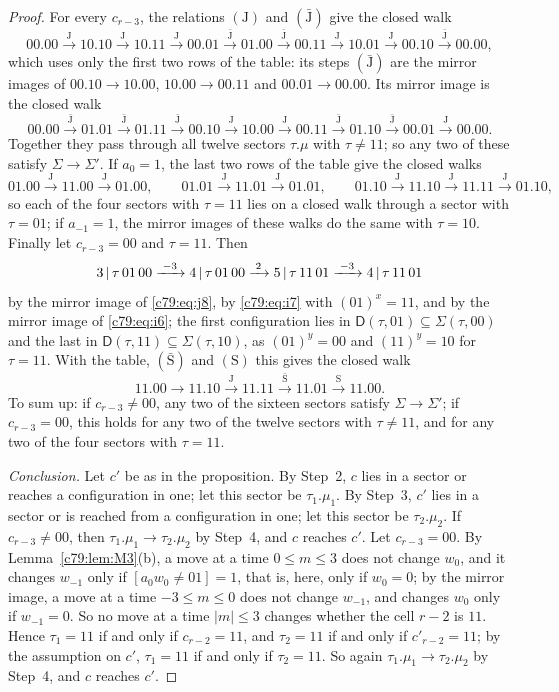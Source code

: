 \begin{proof}
For every $c_{r-3}$, the relations $(\mathrm J)$ and $(\bar{\mathrm J})$ give the closed walk
\[
00.00\xrightarrow{\mathrm J}10.10\xrightarrow{\mathrm J}10.11\xrightarrow{\mathrm J}00.01\xrightarrow{\bar{\mathrm J}}01.00\xrightarrow{\bar{\mathrm J}}00.11\xrightarrow{\mathrm J}10.01\xrightarrow{\mathrm J}00.10\xrightarrow{\bar{\mathrm J}}00.00,
\]
which uses only the first two rows of the table: its steps $(\bar{\mathrm J})$ are the mirror images of $00.10\to10.00$, $10.00\to00.11$ and $00.01\to00.00$. Its mirror image is the closed walk
\[
00.00\xrightarrow{\bar{\mathrm J}}01.01\xrightarrow{\bar{\mathrm J}}01.11\xrightarrow{\bar{\mathrm J}}00.10\xrightarrow{\mathrm J}10.00\xrightarrow{\mathrm J}00.11\xrightarrow{\bar{\mathrm J}}01.10\xrightarrow{\bar{\mathrm J}}00.01\xrightarrow{\mathrm J}00.00 .
\]
Together they pass through all twelve sectors $\tau.\mu$ with $\tau\ne11$; so any two of these satisfy $\Sigma\to\Sigma'$. If $a_0=1$, the last two rows of the table give the closed walks
\[
01.00\xrightarrow{\mathrm J}11.00\xrightarrow{\mathrm J}01.00,\qquad01.01\xrightarrow{\mathrm J}11.01\xrightarrow{\mathrm J}01.01,\qquad01.10\xrightarrow{\mathrm J}11.10\xrightarrow{\mathrm J}11.11\xrightarrow{\mathrm J}01.10,
\]
so each of the four sectors with $\tau=11$ lies on a closed walk through a sector with $\tau=01$; if $a_{-1}=1$, the mirror images of these walks do the same with $\tau=10$. Finally let $c_{r-3}=00$ and $\tau=11$. Then
\[
3\,|\,\tau\,01\,00\xrightarrow{\;-3\;}4\,|\,\tau\,01\,00\xrightarrow{\;2\;}5\,|\,\tau\,11\,01\xrightarrow{\;-3\;}4\,|\,\tau\,11\,01
\]
by the mirror image of \eqref{c79:eq:j8}, by \eqref{c79:eq:i7} with $(01)^x=11$, and by the mirror image of \eqref{c79:eq:i6}; the first configuration lies in $\mathsf D(\tau,01)\subseteq\Sigma(\tau,00)$ and the last in $\mathsf D(\tau,11)\subseteq\Sigma(\tau,10)$, as $(01)^y=00$ and $(11)^y=10$ for $\tau=11$. With the table, $(\bar{\mathrm S})$ and $(\mathrm S)$ this gives the closed walk
\[
11.00\to11.10\xrightarrow{\mathrm J}11.11\xrightarrow{\bar{\mathrm S}}11.01\xrightarrow{\mathrm S}11.00 .
\]
To sum up: if $c_{r-3}\ne00$, any two of the sixteen sectors satisfy $\Sigma\to\Sigma'$; if $c_{r-3}=00$, this holds for any two of the twelve sectors with $\tau\ne11$, and for any two of the four sectors with $\tau=11$.

\emph{Conclusion.} Let $c'$ be as in the proposition. By Step~2, $c$ lies in a sector or reaches a configuration in one; let this sector be $\tau_1.\mu_1$. By Step~3, $c'$ lies in a sector or is reached from a configuration in one; let this sector be $\tau_2.\mu_2$. If $c_{r-3}\ne00$, then $\tau_1.\mu_1\to\tau_2.\mu_2$ by Step~4, and $c$ reaches $c'$. Let $c_{r-3}=00$. By Lemma~\ref{c79:lem:M3}(b), a move at a time $0\le m\le3$ does not change $w_0$, and it changes $w_{-1}$ only if $[a_0w_0\ne01]=1$, that is, here, only if $w_0=0$; by the mirror image, a move at a time $-3\le m\le0$ does not change $w_{-1}$, and changes $w_0$ only if $w_{-1}=0$. So no move at a time $|m|\le3$ changes whether the cell $r-2$ is $11$. Hence $\tau_1=11$ if and only if $c_{r-2}=11$, and $\tau_2=11$ if and only if $c'_{r-2}=11$; by the assumption on $c'$, $\tau_1=11$ if and only if $\tau_2=11$. So again $\tau_1.\mu_1\to\tau_2.\mu_2$ by Step~4, and $c$ reaches $c'$.
\end{proof}

